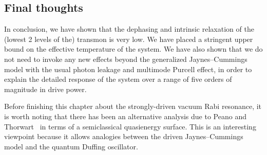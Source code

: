 \subsection{Final thoughts}
In conclusion, we have shown that the dephasing and intrinsic relaxation of the (lowest 2 levels of the) transmon is very low. We have placed a stringent upper bound on the effective temperature of the system. We have also shown that we do not need to invoke any new effects beyond the generalized Jaynes--Cummings model with the usual photon leakage and multimode Purcell effect, in order to explain the detailed response of the system over a range of five orders of magnitude in drive power.

Before finishing this chapter about the strongly-driven vacuum Rabi resonance, it is worth noting that there has been an alternative analysis due to Peano and Thorwart~\cite{peano_dynamical_2009} in terms of a semiclassical quasienergy surface. This is an interesting viewpoint because it allows analogies between the driven Jaynes--Cummings model and the quantum Duffing oscillator.
